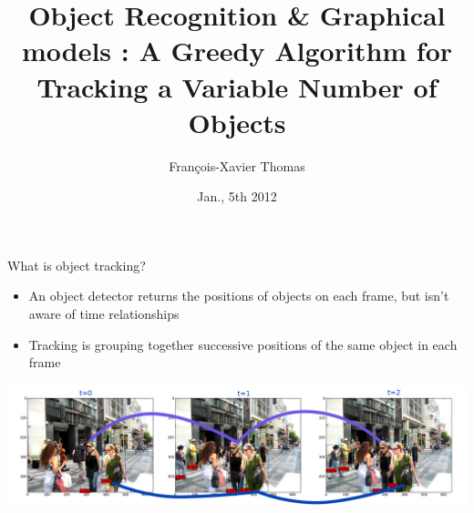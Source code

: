\documentclass[final]{beamer}
\title[MVA Project]{Object Recognition \& Graphical models : A Greedy Algorithm for Tracking a Variable Number of Objects}
\author[Thomas]{François-Xavier Thomas}
\institute[ENS Cachan]{MVA Master, ENS Cachan}
\date{Jan., 5th 2012}
\begin{document}
  \begin{frame}
    \begin{block}{\huge What is object tracking?}
      \LARGE
      \begin{itemize}
        \item An object detector returns the positions of objects on each frame, but isn't aware of time relationships
        \item Tracking is grouping together successive positions of the same object in each frame
      \end{itemize}
      \centering
      \includegraphics[width=0.95\linewidth]{figures/tracking-frames.png}
    \end{block}
  \end{frame}
\end{document}
